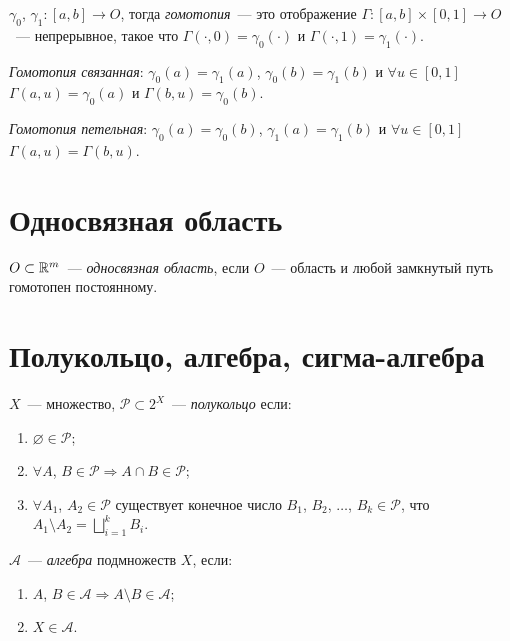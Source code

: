 \documentclass{article}
\begin{document}
        $\gamma_0$, $\gamma_1 : [a, b] \rightarrow O$, тогда \textit{гомотопия}~--- это отображение $\Gamma : [a, b] \times [0, 1] \rightarrow O$~--- непрерывное, такое что $\Gamma(\cdot, 0) = \gamma_0(\cdot)$ и $\Gamma(\cdot, 1) = \gamma_1(\cdot)$.
        
        \textit{Гомотопия связанная}: $\gamma_0(a) = \gamma_1(a)$, $\gamma_0(b) = \gamma_1(b)$ и $\forall u \in [0, 1]$ $\Gamma(a, u) = \gamma_0(a)$ и $\Gamma(b, u) = \gamma_0(b)$.
        
        \textit{Гомотопия петельная}: $\gamma_0(a) = \gamma_0(b)$, $\gamma_1(a) = \gamma_1(b)$ и $\forall u \in [0, 1]$ $\Gamma(a, u) = \Gamma(b, u)$.
        
    \newpage
    
    \section{Односвязная область}
    
        $O \subset \mathbb{R}^m$~--- \textit{односвязная область}, если $O$~--- область и любой замкнутый путь гомотопен постоянному.
        
    \newpage
    
    \section{Полукольцо, алгебра, сигма-алгебра}
    
        $X$~--- множество, $\mathcal{P} \subset 2^X$~--- \textit{полукольцо} если:
        
        \begin{enumerate}
        
            \item $\varnothing \in \mathcal{P}$;
            
            \item $\forall A$, $B \in \mathcal{P} \Rightarrow A \cap B \in \mathcal{P}$;
            
            \item $\forall A_1$, $A_2 \in \mathcal{P}$ существует конечное число $B_1$, $B_2$, $\ldots$, $B_k \in \mathcal{P}$, что $A_1 \setminus A_2 =  \bigsqcup\limits^k_{i = 1} B_i$.
            
        \end{enumerate}
    
        $\mathcal{A}$~--- \textit{алгебра} подмножеств $X$, если:
        
        \begin{enumerate}
        
            \item $A$, $B \in \mathcal{A} \Rightarrow A \setminus B \in \mathcal{A}$;
            
            \item $X \in \mathcal{A}$.
            
        \end{enumerate}
        
\end{document}
